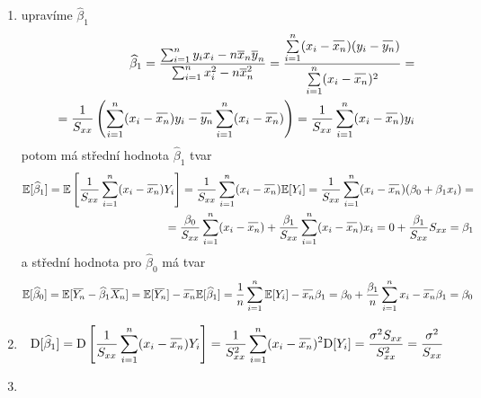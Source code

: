\begin{proofname}

   \begin{enumerate}
  \item upravíme $ \widehat{\beta}_{1} $
  		\begin{equation*}
  		\begin{aligned}
  		    \widehat{\beta}_{1} = \dfrac{\sum_{i=1}^{n} y_{i} x_{i} - n \overline{x}_{n} \overline{y}_{n}}{\sum_{i=1}^{n} x_{i}^{2} - n \overline{x}_{n}^{2}} = \frac{\sumin (x_i - \oxnn )(y_i - \oynn )}{\sumin (x_i - \oxnn )^{2}} = \\
  		    = \frac{1}{S_{xx}} \left( \sumin (x_i - \oxnn ) y_i - \oynn \sumin (x_i - \oxnn )  \right) =  \frac{1}{S_{xx}} \sumin (x_i - \oxnn ) y_i 
  		    \end{aligned}
  		\end{equation*}
  		potom má střední hodnota $ \widehat{\beta}_{1} $ tvar
  		\begin{equation*}
  		\begin{aligned}
  		    \E [ \widehat{\beta}_{1} ] = \E \left[ \frac{1}{S_{xx}} \sumin (x_i - \oxnn ) Y_i \right] = \frac{1}{S_{xx}} \sumin (x_i - \oxnn ) \E [ Y_i ] 
  		    = \frac{1}{S_{xx}} \sumin (x_i - \oxnn ) ( \beta_{0} + \beta_{1} x_i ) = \\ = \frac{\beta_{0}}{S_{xx}} \sumin (x_i - \oxnn ) + \frac{\beta_{1}}{S_{xx}} \sumin (x_i - \oxnn ) x_i = 0 + \frac{\beta_{1}}{S_{xx}} S_{xx} = \beta_{1}
  		    \end{aligned}
  		\end{equation*}
  		a střední hodnota pro $ \widehat{\beta}_{0} $ má tvar 
  		\begin{equation*}
  		\begin{aligned}
  		    \E [ \widehat{\beta}_{0} ] = \E [ \oyn - \widehat{\beta}_{1} \oxn ] = \E [ \oyn ] - \oxnn \E [ \widehat{\beta}_{1} ] = \dfrac{1}{n} \sumin \E [ Y_i ] - \oxnn \beta_1 = \beta_0 + \frac{\beta_1}{n} \sumin x_i - \oxnn \beta_1 = \beta_0
  		    \end{aligned}
  		\end{equation*}
  \item \begin{equation*}
  			\D [ \widehat{\beta}_{1} ] = \D \left[ \frac{1}{S_{xx}} \sumin (x_i - \oxnn ) Y_i \right] = \frac{1}{S_{xx} ^{2}} \sumin (x_i - \oxnn )^{2} \D [ Y_i ] = \frac{\sigma^{2} S_{xx}}{S_{xx}^{2}} = \frac{\sigma^{2}}{S_{xx}}
  		\end{equation*}
  \item  \begin{equation*}

\end{equation*}
\end{enumerate}
\end{proofname}
